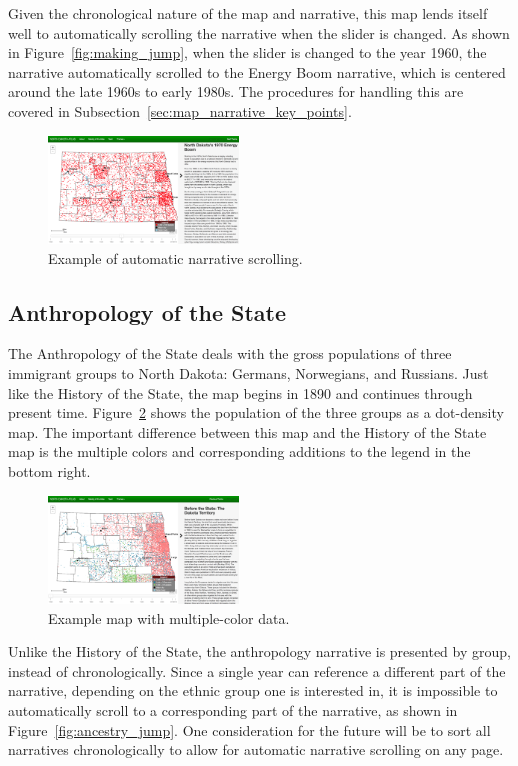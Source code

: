 \documentclass[11pt, final, conference, twocolumn]{IEEEtran}
\begin{document}
Given the chronological nature of the map and narrative, this map lends itself well to automatically scrolling the narrative when the slider is changed. As shown in Figure~\ref{fig:making_jump}, when the slider is changed to the year 1960, the narrative automatically scrolled to the Energy Boom narrative, which is centered around the late 1960s to early 1980s. The procedures for handling this are covered in Subsection~\ref{sec:map_narrative_key_points}.

\begin{figure}[h!]
	\centering
	\includegraphics[width=0.45\textwidth]{making_jump}
	\caption{Example of automatic narrative scrolling.}
	\label{fig:making_map}
\end{figure}

\subsection{Anthropology of the State}
The Anthropology of the State deals with the gross populations of three immigrant groups to North Dakota: Germans, Norwegians, and Russians. Just like the History of the State, the map begins in 1890 and continues through present time. Figure~\ref{fig:ancestry} shows the population of the three groups as a dot-density map. The important difference between this map and the History of the State map is the multiple colors and corresponding additions to the legend in the bottom right.

\begin{figure}[h!]
	\centering
	\includegraphics[width=0.45\textwidth]{ancestry}
	\caption{Example map with multiple-color data.}
	\label{fig:ancestry}
\end{figure}

Unlike the History of the State, the anthropology narrative is presented by group, instead of chronologically. Since a single year can reference a different part of the narrative, depending on the ethnic group one is interested in, it is impossible to automatically scroll to a corresponding part of the narrative, as shown in Figure~\ref{fig:ancestry_jump}. One consideration for the future will be to sort all narratives chronologically to allow for automatic narrative scrolling on any page.
\end{document}
